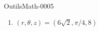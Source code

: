 
\begin{corrige}{OutilsMath-0005}

	\begin{enumerate}
		\item
			$(r,\theta,z)=(6\sqrt{2},\pi/4,8)$
	\end{enumerate}

\end{corrige}

